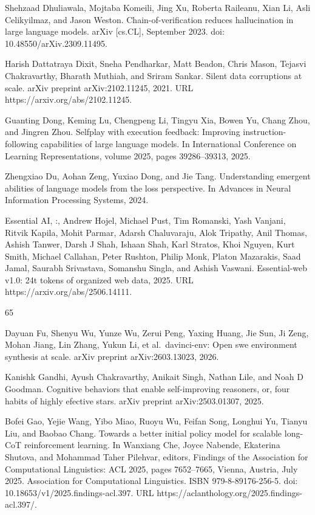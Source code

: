 \documentclass[
  10
]{article}
\begin{document}
Shehzaad Dhuliawala, Mojtaba Komeili, Jing Xu, Roberta Raileanu, Xian
Li, Asli Celikyilmaz, and Jason Weston. Chain-of-verification reduces
hallucination in large language models. arXiv {[}cs.CL{]}, September
2023. doi: 10.48550/arXiv.2309.11495.

Harish Dattatraya Dixit, Sneha Pendharkar, Matt Beadon, Chris Mason,
Tejasvi Chakravarthy, Bharath Muthiah, and Sriram Sankar. Silent data
corruptions at scale. arXiv preprint arXiv:2102.11245, 2021. URL
https://arxiv.org/abs/2102.11245.

Guanting Dong, Keming Lu, Chengpeng Li, Tingyu Xia, Bowen Yu, Chang
Zhou, and Jingren Zhou. Selfplay with execution feedback: Improving
instruction-following capabilities of large language models. In
International Conference on Learning Representations, volume 2025, pages
39286--39313, 2025.

Zhengxiao Du, Aohan Zeng, Yuxiao Dong, and Jie Tang. Understanding
emergent abilities of language models from the loss perspective. In
Advances in Neural Information Processing Systems, 2024.

Essential AI, :, Andrew Hojel, Michael Pust, Tim Romanski, Yash Vanjani,
Ritvik Kapila, Mohit Parmar, Adarsh Chaluvaraju, Alok Tripathy, Anil
Thomas, Ashish Tanwer, Darsh J Shah, Ishaan Shah, Karl Stratos, Khoi
Nguyen, Kurt Smith, Michael Callahan, Peter Rushton, Philip Monk, Platon
Mazarakis, Saad Jamal, Saurabh Srivastava, Somanshu Singla, and Ashish
Vaswani. Essential-web v1.0: 24t tokens of organized web data, 2025. URL
https://arxiv.org/abs/2506.14111.

65

Dayuan Fu, Shenyu Wu, Yunze Wu, Zerui Peng, Yaxing Huang, Jie Sun, Ji
Zeng, Mohan Jiang, Lin Zhang, Yukun Li, et al.~davinci-env: Open swe
environment synthesis at scale. arXiv preprint arXiv:2603.13023, 2026.

Kanishk Gandhi, Ayush Chakravarthy, Anikait Singh, Nathan Lile, and Noah
D Goodman. Cognitive behaviors that enable self-improving reasoners, or,
four habits of highly efective stars. arXiv preprint arXiv:2503.01307,
2025.

Bofei Gao, Yejie Wang, Yibo Miao, Ruoyu Wu, Feifan Song, Longhui Yu,
Tianyu Liu, and Baobao Chang. Towards a better initial policy model for
scalable long-CoT reinforcement learning. In Wanxiang Che, Joyce
Nabende, Ekaterina Shutova, and Mohammad Taher Pilehvar, editors,
Findings of the Association for Computational Linguistics: ACL 2025,
pages 7652--7665, Vienna, Austria, July 2025. Association for
Computational Linguistics. ISBN 979-8-89176-256-5. doi:
10.18653/v1/2025.findings-acl.397. URL
https://aclanthology.org/2025.findings-acl.397/.
\end{document}
